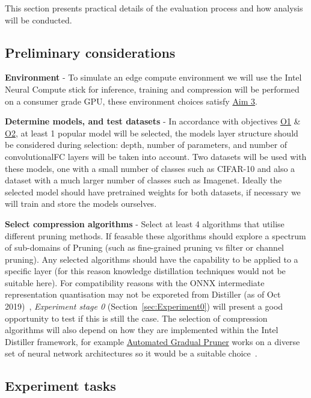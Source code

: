 \documentclass[../D1.tex]{subfiles}
\begin{document}
This section presents practical details of the evaluation process and how analysis will be conducted. 

\subsection{Preliminary considerations}
\textbf{Environment} - To simulate an edge compute environment we will use the Intel Neural Compute stick for inference, training and compression will be performed on a consumer grade GPU, these environment choices satisfy \hyperref[Aim3]{Aim 3}.

\textbf{Determine models, and test datasets} - In accordance with objectives \hyperref[obj:ModelSel]{O1} \& \hyperref[obj:DataSel]{O2}, at least 1 popular model will be selected, the models layer structure should be considered during selection: depth, number of parameters, and number of convolutional\/FC layers will be taken into account. 
Two datasets will be used with these models, one with a small number of classes such as CIFAR-10 and also a dataset with a much larger number of classes such as Imagenet. Ideally the selected model should have pretrained weights for both datasets, if necessary we will train and store the models ourselves.

\textbf{Select compression algorithms} - Select at least 4 algorithms that utilise different pruning methods. If feasable these algorithms should explore a spectrum of sub-domains of Pruning (such as fine-grained pruning vs filter or channel pruning). Any selected algorithms should have the capability to be applied to a specific layer (for this reason knowledge distillation techniques would not be suitable here).
For compatibility reasons with the ONNX intermediate representation quantisation may not be exporeted from Distiller (as of Oct 2019)~\autocite{zmoraNeuralNetworkDistiller2019}, \emph{Experiment stage 0} (Section~\ref{sec:Experiment0}) will present a good opportunity to test if this is still the case.
The selection of compression algorithms will also depend on how they are implemented within the Intel Distiller framework, for example \href{https://github.com/IntelLabs/distiller/blob/master/distiller/pruning/automated_gradual_pruner.py}{Automated Gradual Pruner} works on a diverse set of neural network architectures so it would be a suitable choice~\autocite{zhuPruneNotPrune2017}.

\newpage
\subsection{Experiment tasks}\label{sec:ExperimentTasks}
\end{document}
